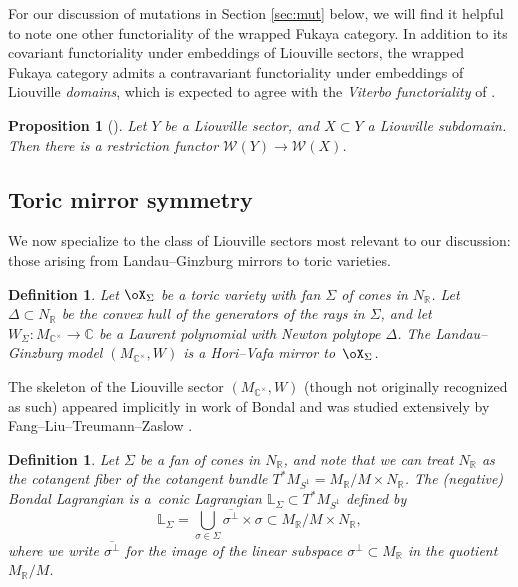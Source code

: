 \documentclass[10pt,a4paper]{amsart}
\numberwithin{equation}{section}
\newtheorem{Proposition}[Theorem]{Proposition}
\newtheorem{Definition}[Theorem]{Definition}
\def\CC{\mathbb{C}}
\def\LL{\mathbb{L}}
\def\RR{\mathbb{R}}
\def\cW{\mathcal{W}}
\begin{document}
For our discussion of mutations in Section \ref{sec:mut} below, we will find it helpful to note one other functoriality of the wrapped Fukaya category. In addition to its covariant functoriality under embeddings of Liouville sectors, the wrapped Fukaya category admits a contravariant functoriality under embeddings of Liouville {\em domains}, which is expected to agree with the {\em Viterbo functoriality} of \cite{AS-viterbo}.

\begin{Proposition}[{\cite[Section 8.3]{GPS2}}]\label{prop:viterbo}
 Let $Y$ be a Liouville sector, and $X\subset Y$ a Liouville subdomain. Then there is a restriction functor $\cW(Y)\to\cW(X)$.
\end{Proposition}

\subsection{Toric mirror symmetry}
We now specialize to the class of Liouville sectors most relevant to our discussion: those arising from Landau--Ginzburg mirrors to toric varieties.
\begin{Definition}
 Let $\oX_\Sigma$ be a toric variety with fan $\Sigma$ of cones in $N_\RR$. Let $\Delta\subset N_\RR$ be the convex hull of the generators of the rays in $\Sigma$, and let $W_\Sigma\colon M_{\CC^\times}\to \CC$ be a Laurent polynomial with Newton polytope $\Delta$. The Landau--Ginzburg model $(M_{\CC^\times},W)$ is a {\em Hori--Vafa mirror} to~$\oX_\Sigma$.
\end{Definition}

The skeleton of the Liouville sector $(M_{\CC^\times},W)$ (though not originally recognized as such) appeared implicitly in work of Bondal \cite{Bo-ccc} and was studied extensively by Fang--Liu--Treumann--Zaslow \cite{FLTZ2,FLTZ1,FLTZ3}.

\begin{Definition}\label{defn:bondal-lag}
 Let $\Sigma$ be a fan of cones in $N_\RR$, and note that we can treat $N_\RR$ as the cotangent fiber of the cotangent bundle $T^*M_{S^1} = M_\RR/M\times N_\RR$.
 The (negative) {\em Bondal Lagrangian} is a~conic Lagrangian $\LL_\Sigma\subset T^*M_{S^1}$ defined by
 \begin{equation}\label{eq:bondal-lag}
 \LL_\Sigma = \bigcup_{\sigma \in \Sigma}\overline{\sigma^\perp}\times \sigma\subset M_\RR/M\times N_\RR,
\end{equation}
where we write $\overline{\sigma^\perp}$ for the image of the linear subspace $\sigma^\perp\subset M_\RR$ in the quotient $M_\RR/M$.
\end{Definition}
\end{document}
